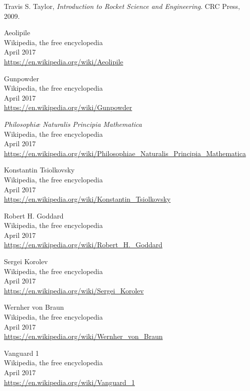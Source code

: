 \documentclass{article}
\begin{document}
\cleardoublepage

\begin{thebibliography}{99}

	Travis S. Taylor,
	\emph{Introduction to Rocket Science and Engineering}.
	CRC Press,
	2009.
	
	Aeolipile\\
	Wikipedia, the free encyclopedia\\
	April 2017\\
	\url{https://en.wikipedia.org/wiki/Aeolipile}
	
	Gunpowder\\
	Wikipedia, the free encyclopedia\\
	April 2017\\
	\url{https://en.wikipedia.org/wiki/Gunpowder}

	\textit{Philosophiæ Naturalis Principia Mathematica}\\
	Wikipedia, the free encyclopedia\\
	April 2017\\
	\url{https://en.wikipedia.org/wiki/Philosophiae_Naturalis_Principia_Mathematica}
	
	Konstantin Tsiolkovsky\\
	Wikipedia, the free encyclopedia\\
	April 2017\\
	\url{https://en.wikipedia.org/wiki/Konstantin_Tsiolkovsky}
	
	Robert H. Goddard\\
	Wikipedia, the free encyclopedia\\
	April 2017\\
	\url{https://en.wikipedia.org/wiki/Robert_H._Goddard}	
	
	Sergei Korolev\\
	Wikipedia, the free encyclopedia\\
	April 2017\\
	\url{https://en.wikipedia.org/wiki/Sergei_Korolev}	

	Wernher von Braun\\
	Wikipedia, the free encyclopedia\\
	April 2017\\
	\url{https://en.wikipedia.org/wiki/Wernher_von_Braun}

	Vanguard 1\\
	Wikipedia, the free encyclopedia\\
	April 2017\\
	\url{https://en.wikipedia.org/wiki/Vanguard_1}
	

\end{thebibliography}
\end{document}
